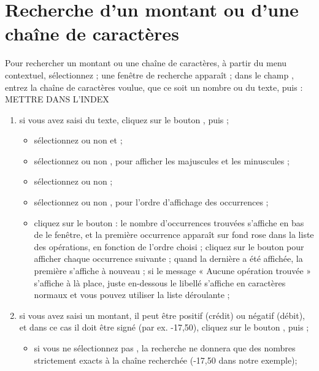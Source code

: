\section{Recherche d'un montant ou d'une chaîne de caractères \label{transactions-find}}

Pour rechercher un montant ou une chaîne de caractères, à partir du menu contextuel, sélectionnez  ; une fenêtre de recherche apparaît ; dans le champ , entrez la chaîne de caractères voulue, que ce soit un nombre ou du texte, puis :
METTRE DANS L'INDEX

\begin{enumerate}
	\item si vous avez saisi du texte, cliquez sur le bouton , puis ;
	\begin{itemize}	
		\item sélectionnez ou non  et  ;
		\item sélectionnez ou non , pour afficher les majuscules et  les minuscules ;
		\item sélectionnez ou non  ;
		\item sélectionnez ou non , pour l'ordre d'affichage des occurrences ; 
		\item cliquez sur le bouton  : le nombre d'occurrences trouvées s'affiche en bas de le fenêtre, et la première occurrence apparaît sur fond rose{\couleur} dans la liste des opérations, en fonction de l'ordre choisi ; cliquez sur le bouton  pour afficher chaque occurrence suivante ; quand la dernière a été affichée, la première s'affiche à nouveau ; si le message « Aucune opération trouvée » s'affiche à là place, juste en-dessous le libellé  s'affiche en caractères normaux et vous pouvez utiliser la liste déroulante  ;
	\end{itemize}	
	\item si vous avez saisi un montant, il peut être positif (crédit) ou négatif (débit), et dans ce cas il doit être signé (par ex. -17,50), cliquez sur le bouton , puis ;
	\begin{itemize}
		\item si vous ne sélectionnez pas , la recherche ne donnera que des nombres strictement exacts à la chaîne recherchée (-17,50 dans notre exemple);

\end{itemize}
\end{enumerate}
